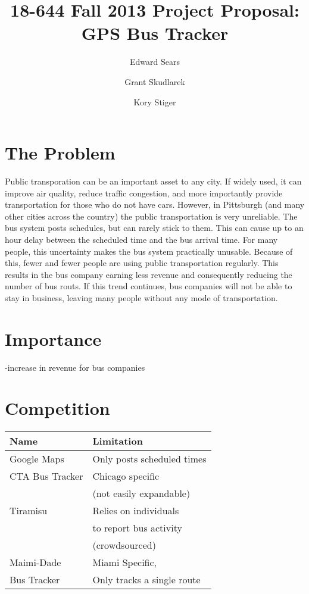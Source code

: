 \documentclass[pageno]{jpaper}
\begin{document}
\title{
18-644 Fall 2013 Project Proposal: GPS Bus Tracker}
\author{Edward Sears \and Grant Skudlarek \and Kory Stiger}

\date{}
\maketitle

\thispagestyle{empty}

\begin{abstract}
\end{abstract}

\section{The Problem}

    Public transporation can be an important asset to any city. If widely 
used, it can improve air quality, reduce traffic congestion, and more 
importantly provide transportation for those who do not have cars.  
However, in Pittsburgh (and many other cities across the country) 
the public transportation is very unreliable.  The bus system posts 
schedules, but can rarely stick to them.  This can cause up to an 
hour delay between the scheduled time and the bus arrival time.  For 
many people, this uncertainty makes the bus system practically unusable.  
Because of this, fewer and fewer people are using public transportation 
regularly.  This results in the bus company earning less revenue and 
consequently reducing the number of bus routs.  If this trend continues, 
bus companies will not be able to stay in business, leaving many people 
without any mode of transportation.

\section{Importance}

-increase in revenue for bus companies

\section{Competition}

\begin{table}[h!]
  \centering
  \begin{tabular}{|l|l|}
    \hline
    \textbf{Name} & \textbf{Limitation}\\
    \hline
    \hline
    Google Maps & Only posts scheduled times \\
    \hline
    CTA Bus Tracker & Chicago specific \\
        &(not easily expandable)\\
    \hline
    Tiramisu & Relies on individuals \\
                    &to report bus activity\\
                    &(crowdsourced) \\
    \hline
    Maimi-Dade  & Miami Specific,\\
    Bus Tracker & Only tracks a single route \\
    \hline
  \end{tabular}
  \label{table:formatting}
\end{table}
\end{document}
